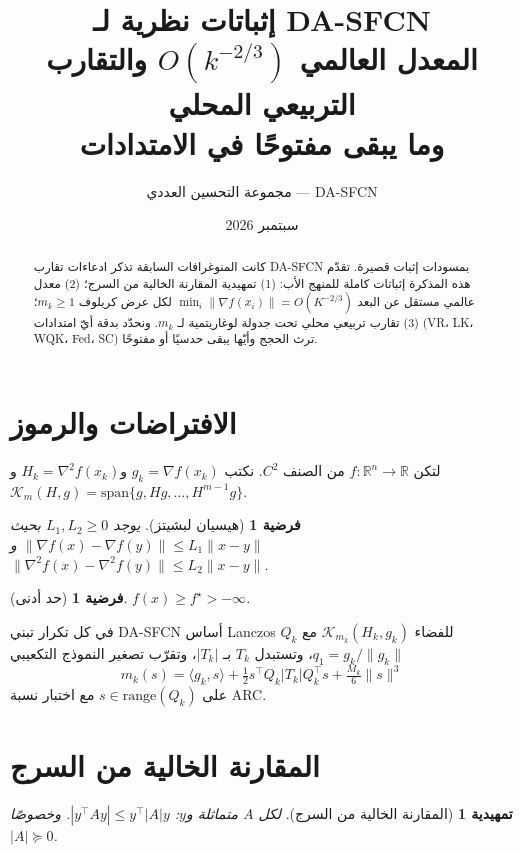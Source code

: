 \documentclass[12pt,a4paper]{article}
\title{\textbf{إثباتات نظرية لـ DA-SFCN}\\
\large المعدل العالمي $O(k^{-2/3})$ والتقارب التربيعي المحلي\\
وما يبقى مفتوحًا في الامتدادات}
\author{مجموعة التحسين العددي --- DA-SFCN}
\date{سبتمبر 2026}
\newtheorem{lemma}[theorem]{تمهيدية}
\newtheorem{assumption}[theorem]{فرضية}
\theoremstyle{definition}
\begin{document}
\maketitle

\begin{abstract}
كانت المنوغرافات السابقة تذكر ادعاءات تقارب \textenglish{DA-SFCN} بمسودات
إثبات قصيرة. تقدّم هذه المذكرة إثباتات كاملة للمنهج الأب: (1) تمهيدية
المقارنة الخالية من السرج؛ (2) معدل عالمي مستقل عن البعد
$\min_i\|\nabla f(x_i)\|=O(K^{-2/3})$ لكل عرض كريلوف $m_k\ge 1$؛
(3) تقارب تربيعي محلي تحت جدولة لوغاريتمية لـ $m_k$. ونحدّد بدقة أيّ
امتدادات (VR، LK، WQK، Fed، SC) ترث الحجج وأيّها يبقى حدسيًا أو مفتوحًا.
\end{abstract}

\section{الافتراضات والرموز}
لتكن $f:\mathbb{R}^n\to\mathbb{R}$ من الصنف $C^2$. نكتب
$g_k=\nabla f(x_k)$ و$H_k=\nabla^2 f(x_k)$ و
$\mathcal{K}_m(H,g)=\mathrm{span}\{g,Hg,\dots,H^{m-1}g\}$.

\begin{assumption}[هيسيان لبشيتز]\label{ass:lip}
يوجد $L_1,L_2\ge 0$ بحيث
$\|\nabla f(x)-\nabla f(y)\|\le L_1\|x-y\|$ و
$\|\nabla^2 f(x)-\nabla^2 f(y)\|\le L_2\|x-y\|$.
\end{assumption}

\begin{assumption}[حد أدنى]\label{ass:bound}
$f(x)\ge f^\star>-\infty$.
\end{assumption}

في كل تكرار تبني \textenglish{DA-SFCN} أساس \textenglish{Lanczos}
$Q_k$ للفضاء $\mathcal{K}_{m_k}(H_k,g_k)$ مع $q_1=g_k/\|g_k\|$، وتستبدل
$T_k$ بـ $|T_k|$، وتقرّب تصغير النموذج التكعيبي
\begin{equation}\label{eq:model}
m_k(s)=\langle g_k,s\rangle+\tfrac12 s^\top Q_k|T_k|Q_k^\top s+\tfrac{M_k}{6}\|s\|^3
\end{equation}
على $s\in\mathrm{range}(Q_k)$ مع اختبار نسبة \textenglish{ARC}.

\section{المقارنة الخالية من السرج}
\begin{lemma}[المقارنة الخالية من السرج]\label{lem:sf}
لكل $A$ متماثلة و$y$: $|y^\top A y|\le y^\top |A| y$. وخصوصًا $|A|\succeq 0$.
\end{lemma}
\end{document}
